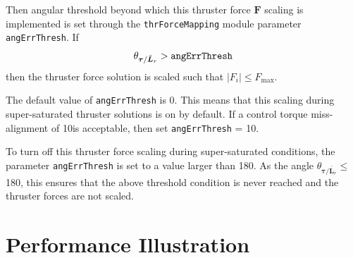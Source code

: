 \documentclass[]{BasiliskReportMemo}
\begin{document}
Then angular threshold beyond which this thruster force $\bm F$ scaling is implemented is set through the  {\tt thrForceMapping} module parameter {\tt angErrThresh}.  If 
$$
	\theta_{\bm\tau/\bar{\bm L}_{r}} > \text{\tt angErrThresh}
$$
then the thruster force solution is scaled such that $|F_{i}| \le F_{\text{max}}$.  

The default value of {\tt angErrThresh} is 0\dg.  This means that this scaling during super-saturated thruster solutions is on by default.  If a control torque miss-alignment of 10\dg is acceptable, then set {\tt angErrThresh} = 10\dg.  

To turn off this thruster force scaling during super-saturated conditions, the parameter  {\tt angErrThresh} is set to a value larger than 180\dg.  As the angle $\theta_{\bm\tau/\bar{\bm L}_{r}} \le $180\dg, this ensures that the above threshold condition is never reached and the thruster forces are not scaled.  




\section{Performance Illustration}\label{sec:PI}
\end{document}
